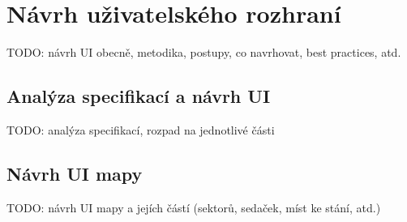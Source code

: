 \chapter{Návrh uživatelského rozhraní}
\label{chap:navrh-uzivatelskeho-rozhrani}
TODO: návrh UI obecně, metodika, postupy, co navrhovat, best practices, atd.

\section{Analýza specifikací a návrh UI}
\label{sec:navrh-ui-analyza}
TODO: analýza specifikací, rozpad na jednotlivé části

\section{Návrh UI mapy}
\label{sec:navrh-ui-mapa}
TODO: návrh UI mapy a jejích částí (sektorů, sedaček, míst ke stání, atd.)
